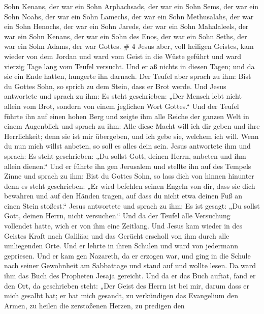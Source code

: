 Sohn Kenans, der war ein Sohn Arphachsads, der war ein Sohn Sems, der
war ein Sohn Noahs, der war ein Sohn Lamechs,  der war ein
Sohn Methusalahs, der war ein Sohn Henochs, der war ein Sohn Jareds, der
war ein Sohn Mahalaleels, der war ein Sohn Kenans,  der war
ein Sohn des Enos, der war ein Sohn Seths, der war ein Sohn Adams, der
war Gottes. \# 4  Jesus aber, voll heiligen Geistes, kam
wieder von dem Jordan und ward vom Geist in die Wüste geführt
 und ward vierzig Tage lang vom Teufel versucht. Und er aß
nichts in diesen Tagen; und da sie ein Ende hatten, hungerte ihn
darnach.  Der Teufel aber sprach zu ihm: Bist du Gottes
Sohn, so sprich zu dem Stein, dass er Brot werde.  Und Jesus
antwortete und sprach zu ihm: Es steht geschrieben: „Der Mensch lebt
nicht allein vom Brot, sondern von einem jeglichen Wort Gottes.``
 Und der Teufel führte ihn auf einen hohen Berg und zeigte
ihm alle Reiche der ganzen Welt in einem Augenblick  und
sprach zu ihm: Alle diese Macht will ich dir geben und ihre
Herrlichkeit; denn sie ist mir übergeben, und ich gebe sie, welchem ich
will.  Wenn du nun mich willst anbeten, so soll es alles
dein sein.  Jesus antwortete ihm und sprach: Es steht
geschrieben: „Du sollst Gott, deinen Herrn, anbeten und ihm allein
dienen.``  Und er führte ihn gen Jerusalem und stellte ihn
auf des Tempels Zinne und sprach zu ihm: Bist du Gottes Sohn, so lass
dich von hinnen hinunter  denn es steht geschrieben: „Er
wird befehlen seinen Engeln von dir, dass sie dich bewahren
 und auf den Händen tragen, auf dass du nicht etwa deinen
Fuß an einen Stein stoßest.``  Jesus antwortete und sprach
zu ihm: Es ist gesagt: „Du sollst Gott, deinen Herrn, nicht versuchen.``
 Und da der Teufel alle Versuchung vollendet hatte, wich er
von ihm eine Zeitlang.  Und Jesus kam wieder in des Geistes
Kraft nach Galiläa; und das Gerücht erscholl von ihm durch alle
umliegenden Orte.  Und er lehrte in ihren Schulen und ward
von jedermann gepriesen.  Und er kam gen Nazareth, da er
erzogen war, und ging in die Schule nach seiner Gewohnheit am Sabbattage
und stand auf und wollte lesen.  Da ward ihm das Buch des
Propheten Jesaja gereicht. Und da er das Buch auftat, fand er den Ort,
da geschrieben steht:  „Der Geist des Herrn ist bei mir,
darum dass er mich gesalbt hat; er hat mich gesandt, zu verkündigen das
Evangelium den Armen, zu heilen die zerstoßenen Herzen, zu predigen den

